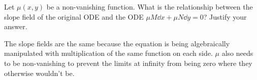 Let $\mu(x,y)$ be a non-vanishing function. What is the relationship between the slope field of the original ODE and the ODE $\mu M \dd x + \mu N \dd y = 0$? Justify your answer.

\nl The slope fields are the same because the equation is being algebraically manipulated with multiplication of the same function on each side. $\mu$ also needs to be non-vanishing to prevent the limits at infinity from being zero where they otherwise wouldn't be.
